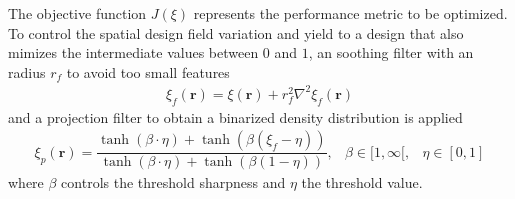     The objective function $\mathit{J}(\xi)$ represents the performance metric to be optimized. 
    To control the spatial design field variation and yield to a design that also mimizes the intermediate values between $0$ and $1$, an soothing filter with an radius $r_f$ to avoid too small features
    \begin{equation}
        \begin{aligned}
        \xi_f(\mathbf{r}) = \xi(\mathbf{r}) + r^2_f\nabla^2\xi_f(\mathbf{r})
        \end{aligned}
    \end{equation}
    and a projection filter to obtain a binarized density distribution is applied
\begin{equation}
    \begin{aligned}
        \xi_p(\mathbf{r}) = \dfrac{
        \tanh \left( {\beta \cdot \eta} \right)+ \tanh{ \left( \beta \left( \xi_f - \eta \right) \right) }
        }
        { \tanh{\left( \beta \cdot \eta \right)} + \tanh{\left( \beta \left( 1-\eta \right)\right)} },  & \beta \in [1, \infty[, & \eta \in [0, 1]
    \end{aligned}
\end{equation}
where $\beta$ controls the threshold sharpness and $\eta$ the threshold value.
  







